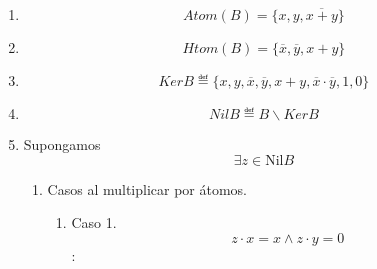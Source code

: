 \documentclass[
]{article}
\providecommand{\tightlist}{%
  \setlength{\itemsep}{0pt}\setlength{\parskip}{0pt}}
\begin{document}
\begin{enumerate}
\begin{enumerate}
\begin{enumerate}
\begin{enumerate}
        \begin{enumerate}
        \def\labelenumv{\arabic{enumv}.}
        \item
          Supongamos que no:

          \[\exists{z \in \mathit{Atom}}{{(B)} \smallsetminus {\{{x,y}\}}}{z \neq {\overline{x} \cdot \overline{y}}}\]
        \item
          \[{{({x + y})} \cdot z} = 0\]

          \begin{enumerate}
          \def\labelenumvi{\arabic{enumvi}.}
          \tightlist
          \item
            \[{{{({x \cdot z})} + {({y \cdot z})}} = {0 + 0}} = 0\]
          \end{enumerate}
        \item
          \[{\overline{x+y} \cdot z} = 0\]

          \begin{enumerate}
          \def\labelenumvi{\arabic{enumvi}.}
          \tightlist
          \item
            \[\overline{x+y},{z \in \mathit{Atom}}{{{(B)} \land \overline{x+y}} \neq z}\]
          \end{enumerate}
        \item
          \[{z = 0}\mathit{ABSURDO}\]
        \end{enumerate}
      \item
        \[\mathit{Atom}{{(B)} = {\{{x,y,\overline{x+y}}\}}}\]
      \item
        \[\mathit{Htom}{{(B)} = {\{{\overline{x},\overline{y},{x + y}}\}}}\]
      \item
        \[\mathsf{\mathit{Ker}}B ≝ {\{{x,y,\overline{x},\overline{y},{x + y},{\overline{x} \cdot \overline{y}},1,0}\}}\]
      \item
        \[\mathsf{\mathit{Nil}}B ≝ {B \smallsetminus {\mathsf{\mathit{Ker}}B}}\]
      \item
        Supongamos \[\exists{z \in {\mathsf{\mathrm{Nil}}B}}\]

        \begin{enumerate}
        \def\labelenumv{\arabic{enumv}.}
        \item
          Casos al multiplicar por átomos.

          \begin{enumerate}
          \def\labelenumvi{\arabic{enumvi}.}
          \item
            Caso 1. \[{{z \cdot x} = {{x \land z} \cdot y}} = 0\]:


\end{enumerate}
\end{enumerate}
\end{enumerate}
\end{enumerate}
\end{enumerate}
\end{enumerate}
\end{document}
